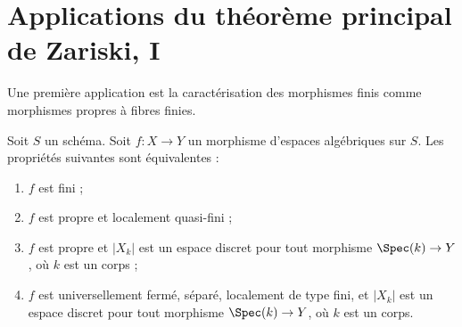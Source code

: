 \section{Applications du théorème principal de Zariski, I}
\label{section-applications-zmt}

\noindent
Une première application est la caractérisation des morphismes
finis comme morphismes propres à fibres finies.

\begin{lemma}
\label{lemma-characterize-finite}
Soit $S$ un schéma. Soit $f : X \to Y$ un morphisme d'espaces algébriques
sur $S$. Les propriétés suivantes sont équivalentes :
\begin{enumerate}
\item $f$ est fini ;
\item $f$ est propre et localement quasi-fini ;
\item $f$ est propre et $|X_k|$ est un espace discret pour tout morphisme
$\Spec(k) \to Y$, où $k$ est un corps ;
\item $f$ est universellement fermé, séparé, localement de type fini,
et $|X_k|$ est un espace discret pour tout morphisme $\Spec(k) \to Y$,
où $k$ est un corps.
\end{enumerate}
\end{lemma}

